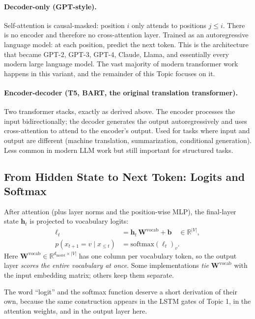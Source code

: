 \documentclass[11pt]{article}
\theoremstyle{remark}
\begin{document}
\paragraph{Decoder-only (GPT-style).}
Self-attention is causal-masked: position \(i\) only attends to positions \(j \leq i\). There is no encoder and therefore no cross-attention layer. Trained as an autoregressive language model: at each position, predict the next token. This is the architecture that became GPT-2, GPT-3, GPT-4, Claude, Llama, and essentially every modern large language model. The vast majority of modern transformer work happens in this variant, and the remainder of this Topic focuses on it.

\paragraph{Encoder-decoder (T5, BART, the original translation transformer).}
Two transformer stacks, exactly as derived above. The encoder processes the input bidirectionally; the decoder generates the output autoregressively and uses cross-attention to attend to the encoder's output. Used for tasks where input and output are different (machine translation, summarization, conditional generation). Less common in modern LLM work but still important for structured tasks.

\subsection{From Hidden State to Next Token: Logits and Softmax}

After attention (plus layer norms and the position-wise MLP), the final-layer state \(\mathbf{h}_t\) is projected to vocabulary logits:
\begin{align}
\boldsymbol{\ell}_t &= \mathbf{h}_t\,\mathbf{W}^{\text{vocab}} + \mathbf{b}\quad\in\mathbb{R}^{|V|},\\
p(x_{t+1}=v\mid x_{\le t}) &= \text{softmax}(\boldsymbol{\ell}_t)_v.
\end{align}
Here \(\mathbf{W}^{\text{vocab}}\in\mathbb{R}^{d_{\text{model}}\times |V|}\) has one column per vocabulary token, so the output layer \emph{scores the entire vocabulary at once}. Some implementations \emph{tie} \(\mathbf{W}^{\text{vocab}}\) with the input embedding matrix; others keep them separate.

The word ``logit'' and the softmax function deserve a short derivation of their own, because the same construction appears in the LSTM gates of Topic 1, in the attention weights, and in the output layer here.
\end{document}
